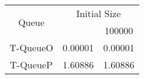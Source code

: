 \begin{tabular}{|c|c|c|}
\hline
\multirow{2}{*}{Queue} & \multicolumn{2}{c|}{Initial Size}\\\cline{2-3}& \qquad 10000 \qquad\quad & 100000\\
\hline
\hline
T-QueueO & 0.00001 & 0.00001\\
T-QueueP & 1.60886 & 1.60886\\
\hline\end{tabular}
